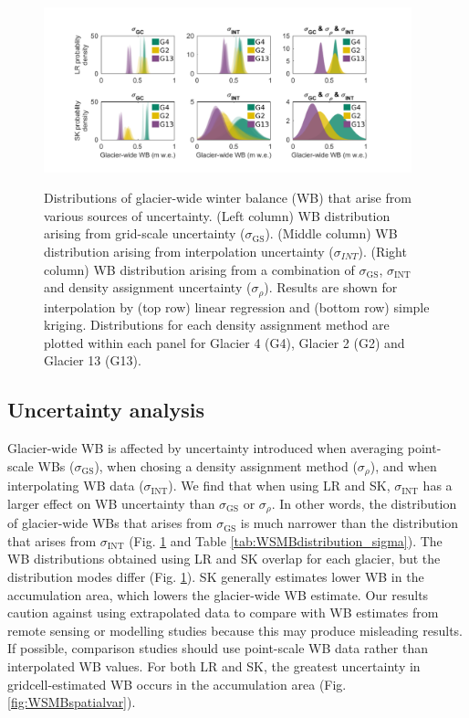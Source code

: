 \documentclass[twocolumn, letterpaper]{igs}
\begin{document}
\begin{figure}
	\centering
	\includegraphics[width =0.95\textwidth]{WSMBDist.pdf}\\
	\caption{Distributions of glacier-wide winter balance (WB) that arise from various sources of uncertainty. (Left column) WB distribution arising from grid-scale uncertainty ($\sigma_{\mathrm{GS}}$). (Middle column) WB distribution arising from interpolation uncertainty ($\sigma_{INT}$). (Right column) WB distribution arising from a combination of $\sigma_{\mathrm{GS}}$, $\sigma_{\mathrm{INT}}$ and density assignment uncertainty ($\sigma_{\rho}$). Results are shown for interpolation by (top row) linear regression and (bottom row) simple kriging. Distributions for each density assignment method are plotted within each panel for Glacier 4 (G4), Glacier 2 (G2) and Glacier 13 (G13).}
	\label{fig:WSMBDist_LR}
\end{figure}

\subsection{Uncertainty analysis}

Glacier-wide WB is affected by uncertainty introduced when averaging point-scale WBs ($\sigma_{\mathrm{GS}}$), when chosing a density assignment method ($\sigma_{\rho}$), and when interpolating WB data ($\sigma_{\mathrm{INT}}$). We find that when using LR and SK, $\sigma_{\mathrm{INT}}$ has a larger effect on WB uncertainty than $\sigma_{\mathrm{GS}}$ or $\sigma_{\rho}$. In other words, the distribution of glacier-wide WBs that arises from $\sigma_{\mathrm{GS}}$ is much narrower than the distribution that arises from $\sigma_{\mathrm{INT}}$ (Fig. \ref{fig:WSMBDist_LR} and Table \ref{tab:WSMBdistribution_sigma}). The WB distributions obtained using LR and SK overlap for each glacier, but the distribution modes differ (Fig. \ref{fig:WSMBDist_LR}). SK generally estimates lower WB in the accumulation area, which lowers the glacier-wide WB estimate.  Our results caution against using extrapolated data to compare with WB estimates from remote sensing or modelling studies because this may produce misleading results. If possible, comparison studies should use point-scale WB data rather than interpolated WB values. For both LR and SK, the greatest uncertainty in gridcell-estimated WB occurs in the accumulation area (Fig. \ref{fig:WSMBspatialvar}).
\end{document}
